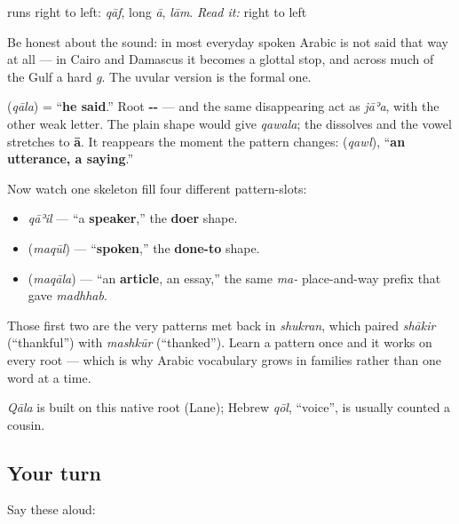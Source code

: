 \textbf{} runs right to left: \emph{qāf}, long \emph{ā}, \emph{lām}. \emph{Read it:} \textbf{} right to left

Be honest about the sound: in most everyday spoken Arabic \textbf{} is not said that way at all — in Cairo and Damascus it becomes a glottal stop, and across much of the Gulf a hard \emph{g}. The uvular version is the formal one.

\begin{cousinweb}
\textbf{} (\emph{qāla}) = \textquotedblleft{}\textbf{he said}.\textquotedblright{} Root \textbf{--} — and the same disappearing act as \emph{jāʾa}, with the other weak letter. The plain shape would give \emph{qawala}; the \textbf{} dissolves and the vowel stretches to \textbf{ā}. It reappears the moment the pattern changes: \textbf{} (\emph{qawl}), \textquotedblleft{}\textbf{an utterance, a saying}.\textquotedblright{}

Now watch one skeleton fill four different pattern-slots:

\begin{itemize}
\raggedright
  \item \emph{qāʾil} — \textquotedblleft{}a \textbf{speaker},\textquotedblright{} the \textbf{doer} shape.
  \item \textbf{} (\emph{maqūl}) — \textquotedblleft{}\textbf{spoken},\textquotedblright{} the \textbf{done-to} shape.
  \item \textbf{} (\emph{maqāla}) — \textquotedblleft{}an \textbf{article}, an essay,\textquotedblright{} the same \emph{ma-} place-and-way prefix that gave \emph{madhhab}.
\end{itemize}

Those first two are the very patterns met back in \emph{shukran}, which paired \emph{shākir} (\textquotedblleft{}thankful\textquotedblright{}) with \emph{mashkūr} (\textquotedblleft{}thanked\textquotedblright{}). Learn a pattern once and it works on every root — which is why Arabic vocabulary grows in families rather than one word at a time.

\emph{Qāla} is built on this native root (Lane); Hebrew \emph{qōl}, \textquotedblleft{}voice\textquotedblright{}, is usually counted a cousin.
\end{cousinweb}

\subsection*{Your turn}
Say these aloud:

